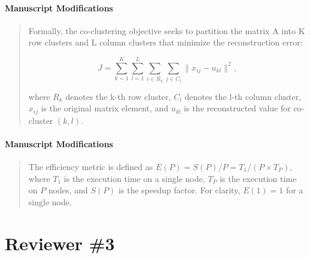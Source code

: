 \documentclass{ar2rc}
\theoremstyle{definition}
\theoremstyle{remark} %
\begin{document}
\paragraph{Manuscript Modifications}

\begin{quote}
  Formally, the co-clustering objective seeks to partition the matrix A into K row clusters and L column clusters that minimize the reconstruction error:

  \begin{equation}
    J = \sum_{k=1}^{K} \sum_{l=1}^{L} \sum_{i \in R_k} \sum_{j \in C_l} \| x_{ij} - u_{kl} \|^2,
  \end{equation}

  where $R_k$ denotes the k-th row cluster, $C_l$ denotes the l-th column cluster, $x_{ij}$ is the original matrix element, and $u_{kl}$ is the reconstructed value for co-cluster $(k,l)$.
\end{quote}



\paragraph{Manuscript Modifications}

\begin{quote}
  The efficiency metric is defined as $E(P) = S(P)/P = T_1/(P \times T_P)$, where $T_1$ is the execution time on a single node, $T_P$ is the execution time on $P$ nodes, and $S(P)$ is the speedup factor. For clarity, $E(1) = 1$ for a single node.
\end{quote}


\section{Reviewer \#3}

\end{document}
